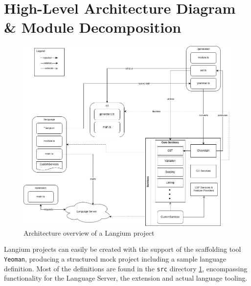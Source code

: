 \section{High-Level Architecture Diagram \& Module Decomposition}
\begin{figure}
  \centering
  \includegraphics[width=\textwidth]{graphics/langiumArchitecture.png}
  \caption{Architecture overview of a Langium project}
  \label{fig:langium-architecture}
\end{figure}

Langium projects can easily be created with the support of the scaffolding tool \verb|Yeoman|, producing a structured mock project including a sample language definition.
Most of the definitions are found in the \verb|src| directory \ref{fig:langium-architecture}, encompassing functionality for the Language Server, the extension and actual language tooling.


